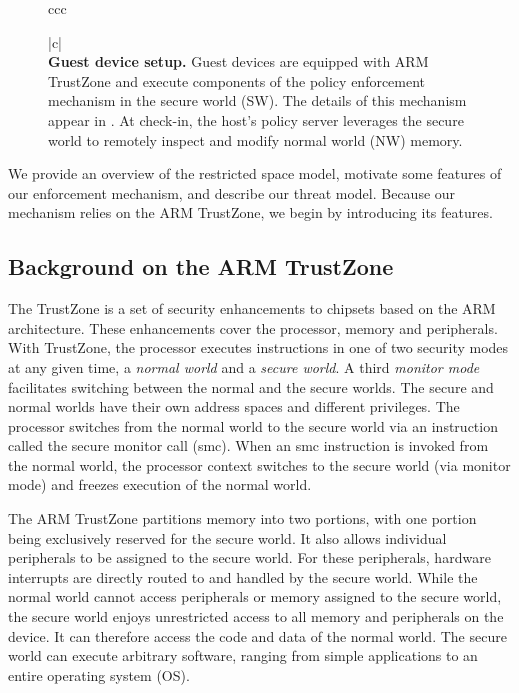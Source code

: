 \begin{figure}[t!]
\begin{tabular}{ccc}
\begin{minipage}{0.46\textwidth}
\begin{tabular}{|c|}
\indent\vspace{-0.5cm}\\
{\small {\bf Guest device setup.} Guest devices are equipped with ARM TrustZone
and execute components of the policy enforcement mechanism in the secure world
(SW). The details of this mechanism appear in .  At
check-in, the host's policy server leverages the secure world to remotely
inspect and modify normal world (NW) memory.}\\
\hline
\end{tabular}
\end{minipage}
\end{tabular}
{\label{figure:restrictedspaces}}
\end{figure}

\label{section:usagemodel}

We provide an overview of the restricted space model, motivate some features of
our enforcement mechanism, and describe our threat model. Because our mechanism
relies on the ARM TrustZone, we begin by introducing its features.

\subsection{Background on the ARM TrustZone}
\label{section:armback}

The TrustZone is a set of security enhancements to chipsets based on the ARM
architecture. These enhancements cover the processor, memory and peripherals.
With TrustZone, the processor executes instructions in one of two security
modes at any given time, a \textit{normal world} and a \textit{secure world}. A
third \textit{monitor mode} facilitates switching between the normal and the
secure worlds.  The secure and normal worlds have their own address spaces and
different privileges.  The processor switches from the normal world to the
secure world via an instruction called the secure monitor call (\textsf{smc}).
When an \textsf{smc} instruction is invoked from the normal world, the
processor context switches to the secure world (via monitor mode) and freezes
execution of the normal world.

The ARM TrustZone partitions memory into two portions, with one portion
being exclusively reserved for the secure world. It also allows individual
peripherals to be assigned to the secure world.  For these peripherals,
hardware interrupts are directly routed to and handled by the secure world.
While the normal world cannot access peripherals or memory assigned to the
secure world, the secure world enjoys unrestricted access to all memory and
peripherals on the device. It can therefore access the code and data of the
normal world. The secure world can execute arbitrary software, ranging from
simple applications to an entire operating system (OS).
%

